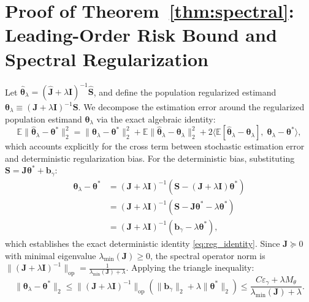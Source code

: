 \documentclass[twoside]{article}
\theoremstyle{definition}
\newcommand{\E}{\mathbb{E}}
\begin{document}
\section{Proof of Theorem~\ref{thm:spectral}: Leading-Order Risk Bound and Spectral Regularization}
\label{app:proof_thm4}
Let $\hat{\boldsymbol{\theta}}_\lambda = (\hat{\boldsymbol{J}} + \lambda \boldsymbol{I})^{-1} \hat{\boldsymbol{S}}$, and define the population regularized estimand $\boldsymbol{\theta}_\lambda \equiv (\boldsymbol{J} + \lambda \boldsymbol{I})^{-1} \boldsymbol{S}$.
We decompose the estimation error around the regularized population estimand $\boldsymbol{\theta}_\lambda$ via the exact algebraic identity:
\begin{equation}
\label{eq:exact_decomp}
    \E\|\hat{\boldsymbol{\theta}}_\lambda - \boldsymbol{\theta}^*\|_2^2 = \|\boldsymbol{\theta}_\lambda - \boldsymbol{\theta}^*\|_2^2 + \E\|\hat{\boldsymbol{\theta}}_\lambda - \boldsymbol{\theta}_\lambda\|_2^2 + 2 \langle \E[\hat{\boldsymbol{\theta}}_\lambda - \boldsymbol{\theta}_\lambda], \; \boldsymbol{\theta}_\lambda - \boldsymbol{\theta}^* \rangle,
\end{equation}
which accounts explicitly for the cross term between stochastic estimation error and deterministic regularization bias.
For the deterministic bias, substituting $\boldsymbol{S} = \boldsymbol{J}\boldsymbol{\theta}^* + \boldsymbol{b}_\gamma$:
\begin{align}
    \boldsymbol{\theta}_\lambda - \boldsymbol{\theta}^* &= (\boldsymbol{J} + \lambda \boldsymbol{I})^{-1} \left( \boldsymbol{S} - (\boldsymbol{J} + \lambda \boldsymbol{I})\boldsymbol{\theta}^* \right) \nonumber \\
    &= (\boldsymbol{J} + \lambda \boldsymbol{I})^{-1} \left( \boldsymbol{S} - \boldsymbol{J}\boldsymbol{\theta}^* - \lambda \boldsymbol{\theta}^* \right) \nonumber \\
    &= (\boldsymbol{J} + \lambda \boldsymbol{I})^{-1} \left( \boldsymbol{b}_\gamma - \lambda \boldsymbol{\theta}^* \right), \label{eq:reg_identity}
\end{align}
which establishes the exact deterministic identity \eqref{eq:reg_identity}.
Since $\boldsymbol{J} \succeq 0$ with minimal eigenvalue $\lambda_{\min}(\boldsymbol{J}) \ge 0$, the spectral operator norm is $\|(\boldsymbol{J} + \lambda \boldsymbol{I})^{-1}\|_{\mathrm{op}} = \frac{1}{\lambda_{\min}(\boldsymbol{J}) + \lambda}$.
Applying the triangle inequality:
\begin{equation}
    \|\boldsymbol{\theta}_\lambda - \boldsymbol{\theta}^*\|_2 \le \|(\boldsymbol{J} + \lambda \boldsymbol{I})^{-1}\|_{\mathrm{op}} \left( \|\boldsymbol{b}_\gamma\|_2 + \lambda \|\boldsymbol{\theta}^*\|_2 \right) \le \frac{C \varepsilon_\gamma + \lambda M_\theta}{\lambda_{\min}(\boldsymbol{J}) + \lambda}.
\end{equation}
\end{document}
